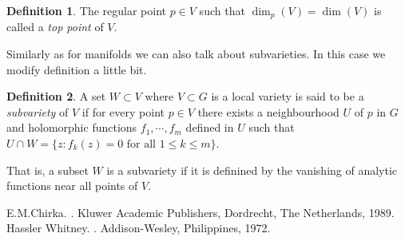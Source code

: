 \documentclass[12pt]{article}
\theoremstyle{theorem}
\theoremstyle{definition}
\newtheorem*{defn}{Definition}
\begin{document}
\begin{defn}
The regular point $p \in V$ such that $\dim_p(V) = \dim(V)$ is called a {\em top
 point} of $V$.
\end{defn}

Similarly as for manifolds we can also talk about subvarieties.  In this case we modify definition a little bit.

\begin{defn}
A set $W \subset V$ where $V \subset G$ is a local variety is said to be
a {\em subvariety} of $V$
if for every point $p \in V$ there exists a neighbourhood $U$ of $p$ in $G$
and holomorphic functions $f_1,\cdots,f_m$ defined in $U$ such that
$U \cap W = \{ z : f_k(z) = 0 \text{ for all } 1\leq k \leq m \}$.
\end{defn}

That is, a subset $W$ is a subvariety if it is definined by the vanishing of analytic functions near all points of $V$.

\begin{thebibliography}{9}
E.\@ M.\@ Chirka.
{\em {}}.
Kluwer Academic Publishers, Dordrecht, The Netherlands, 1989.
Hassler Whitney.
{\em {}}.
Addison-Wesley, Philippines, 1972.
\end{thebibliography}
\end{document}
